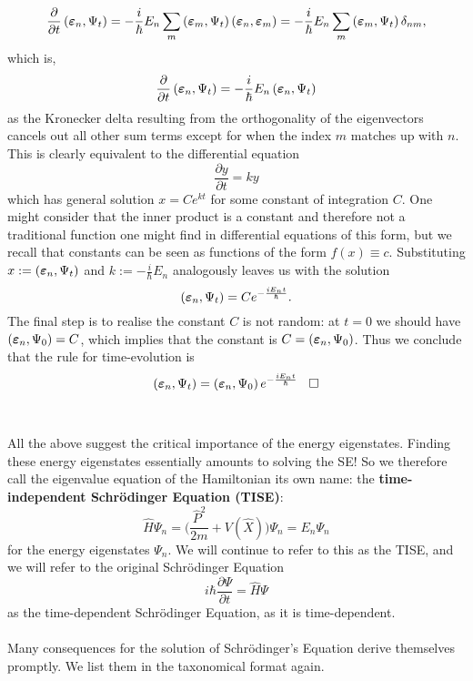 $$
\frac{\partial}{\partial t}\left(\bm{\varepsilon}_{n},\Psi_{t}\right)=-\frac{i}{\hbar}E_{n}\sum_{m}\left(\bm{\varepsilon}_{m},\Psi_{t}\right)\left(\bm{\varepsilon}_{n},\bm{\varepsilon}_{m}\right)=-\frac{i}{\hbar}E_{n}\sum_{m}\left(\bm{\varepsilon}_{m},\Psi_{t}\right)\delta_{nm},
$$
which is,
$$
\frac{\partial}{\partial t}\left(\bm{\varepsilon}_{n},\Psi_{t}\right)=-\frac{i}{\hbar}E_{n}\left(\bm{\varepsilon}_{n},\Psi_{t}\right)
$$
as the Kronecker delta resulting from the orthogonality of the eigenvectors cancels out all other sum terms except for when the index $m$ matches up with $n$. This is clearly equivalent to the differential equation
$$
\frac{\partial y}{\partial t}=ky
$$
which has general solution $x=Ce^{kt}$ for some constant of integration $C$. One might consider that the inner product is a constant and therefore not a traditional function one might find in differential equations of this form, but we recall that constants can be seen as functions of the form $f(x)\equiv c$. Substituting $x:=\left(\bm{\varepsilon}_{n},\Psi_{t}\right)$ and $k:=-\frac{i}{\hbar}E_{n}$ analogously leaves us with the solution
$$
\left(\bm{\varepsilon}_{n},\Psi_{t}\right)=Ce^{-\frac{iE_{n}t}{\hbar}}.
$$
The final step is to realise the constant $C$ is not random: at $t=0$ we should have $\left(\bm{\varepsilon}_{n},\Psi_{0}\right)=C$, which implies that the constant is $C=\left(\bm{\varepsilon}_{n},\Psi_{0}\right)$. Thus we conclude that the rule for time-evolution is 
$$
\left(\bm{\varepsilon}_{n},\Psi_{t}\right)=\left(\bm{\varepsilon}_{n},\Psi_{0}\right)e^{-\frac{iE_{n}t}{\hbar}} \:\:\:\:\square
$$
\\\\
All the above suggest the critical importance of the energy eigenstates. Finding these energy eigenstates essentially amounts to solving the SE! So we therefore call the eigenvalue equation of the Hamiltonian its own name: the \textbf{time-independent Schr\"{o}dinger Equation (TISE)}:
$$
\hat{H}\Psi_{n}= \biggl(\frac{\hat{P}^2}{2m}+V(\hat{X})\biggr)\Psi_{n}=E_{n}\Psi_{n}
$$
for the energy eigenstates $\Psi_{n}$. We will continue to refer to this as the TISE, and we will refer to the original Schr\"{o}dinger Equation
$$
i\hbar \frac{\partial \Psi}{\partial t} = \hat{H}\Psi
$$
as the time-dependent Schr\"{o}dinger Equation, as it is time-dependent.
\\\\
Many consequences for the solution of Schr\"{o}dinger's Equation derive themselves promptly. We list them in the taxonomical format again.
\\

